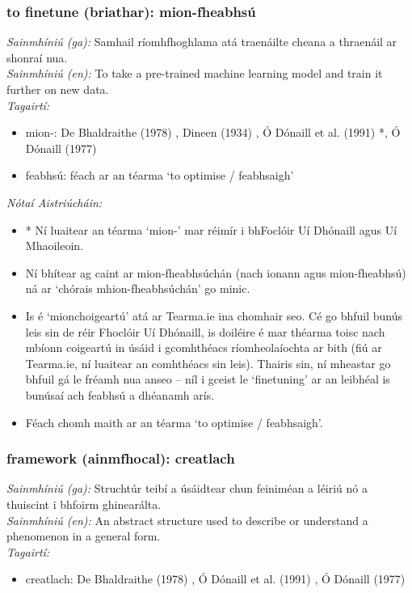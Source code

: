 \subsubsection*{to finetune (briathar): mion-fheabhsú}
 \noindent \textit{Sainmhíniú (ga):} Samhail ríomhfhoghlama atá traenáilte cheana a thraenáil ar shonraí nua.
\\
 \noindent \textit{Sainmhíniú (en):} To take a pre-trained machine learning model and train it further on new data.
\\
 \noindent \textit{Tagairtí:}
\begin{itemize}
	\item mion-: De Bhaldraithe (1978) \cite{de-bhaldraithe}, Dineen (1934) \cite{dineen}, Ó Dónaill et al. (1991) \cite{focloir-beag}*, Ó Dónaill (1977) \cite{odonaill}
	\item feabhsú: féach ar an téarma `to optimise / feabhsaigh'
\end{itemize}

 \noindent \textit{Nótaí Aistriúcháin:}
\begin{itemize}
	\item * Ní luaitear an téarma `mion-' mar réimír i bhFoclóir Uí Dhónaill agus Uí Mhaoileoin.
	\item Ní bhítear ag caint ar mion-fheabhsúchán (nach ionann agus mion-fheabhsú) ná ar `chórais mhion-fheabhsúchán' go minic.
	\item Is é `mionchoigeartú' atá ar Tearma.ie ina chomhair seo. Cé go bhfuil bunús leis sin de réir Fhoclóir Uí Dhónaill, is doiléire é mar théarma toisc nach mbíonn coigeartú in úsáid i gcomhthéacs ríomheolaíochta ar bith (fiú ar Tearma.ie, ní luaitear an comhthéacs sin leis). Thairis sin, ní mheastar go bhfuil gá le fréamh nua anseo -- níl i gceist le `finetuning' ar an leibhéal is bunúsaí ach feabhsú a dhéanamh arís.
	\item Féach chomh maith ar an téarma `to optimise / feabhsaigh'.
\end{itemize}


\subsubsection*{framework (ainmfhocal): creatlach}
 \noindent \textit{Sainmhíniú (ga):} Struchtúr teibí a úsáidtear chun feiniméan a léiriú nó a thuiscint i bhfoirm ghinearálta.
\\
 \noindent \textit{Sainmhíniú (en):} An abstract structure used to describe or understand a phenomenon in a general form.
\\
 \noindent \textit{Tagairtí:}
\begin{itemize}
	\item creatlach: De Bhaldraithe (1978) \cite{de-bhaldraithe}, Ó Dónaill et al. (1991) \cite{focloir-beag}, Ó Dónaill (1977) \cite{odonaill}
\end{itemize}

